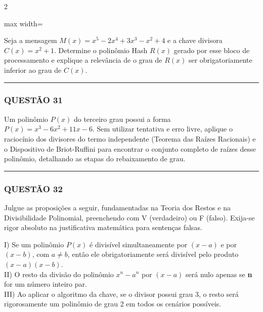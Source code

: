 \documentclass[11pt, a4paper]{article}
\begin{document}
\begin{multicols*}{2}
\begin{center}
\begin{adjustbox}{max width=\linewidth}
\end{adjustbox}
\end{center}

Seja a mensagem $ M(x) = x^5 - 2x^4 + 3x^3 - x^2 + 4 $ e a chave divisora $ C(x) = x^2 + 1 $. Determine o polinômio Hash $ R(x) $ gerado por esse bloco de processamento e explique a relevância de o grau de $ R(x) $ ser obrigatoriamente inferior ao grau de $ C(x) $.

\vspace{0cm} \noindent\textcolor{CorLinha}{\rule{\linewidth}{0.5pt}} \vspace{-0.2cm}
\subsubsection*{QUESTÃO 31}

Um polinômio $ P(x) $ do terceiro grau possui a forma $ P(x) = x^3 - 6x^2 + 11x - 6 $. Sem utilizar tentativa e erro livre, aplique o raciocínio dos divisores do termo independente (Teorema das Raízes Racionais) e o Dispositivo de Briot-Ruffini para encontrar o conjunto completo de raízes desse polinômio, detalhando as etapas do rebaixamento de grau.

\vspace{0cm} \noindent\textcolor{CorLinha}{\rule{\linewidth}{0.5pt}} \vspace{-0.2cm}
\subsubsection*{QUESTÃO 32}

Julgue as proposições a seguir, fundamentadas na Teoria dos Restos e na Divisibilidade Polinomial, preenchendo com V (verdadeiro) ou F (falso). Exija-se rigor absoluto na justificativa matemática para sentenças falsas.

I) Se um polinômio $ P(x) $ é divisível simultaneamente por $ (x - a) $ e por $ (x - b) $, com $ a \neq b $, então ele obrigatoriamente será divisível pelo produto $ (x - a)(x - b) $.\\[0.3cm]
II) O resto da divisão do polinômio $ x^n - a^n $ por $ (x - a) $ será nulo apenas se \textbf{n} for um número inteiro par.\\[0.3cm]
III) Ao aplicar o algoritmo da chave, se o divisor possui grau 3, o resto será rigorosamente um polinômio de grau 2 em todos os cenários possíveis.


\end{multicols*}
\end{document}
